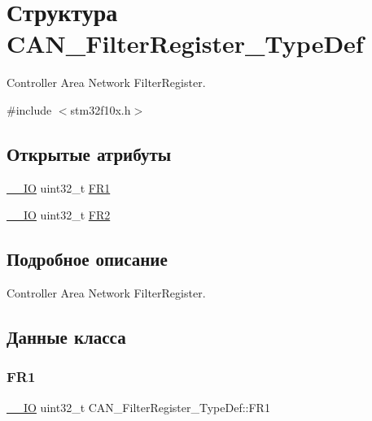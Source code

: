 \hypertarget{struct_c_a_n___filter_register___type_def}{}\section{Структура C\+A\+N\+\_\+\+Filter\+Register\+\_\+\+Type\+Def}
\label{struct_c_a_n___filter_register___type_def}


Controller Area Network Filter\+Register.  




{\ttfamily \#include $<$stm32f10x.\+h$>$}

\subsection*{Открытые атрибуты}
\begin{DoxyCompactItemize}
\item 
\mbox{\hyperlink{group___c_m_s_i_s___c_m3__core__definitions_gaec43007d9998a0a0e01faede4133d6be}{\+\_\+\+\_\+\+IO}} uint32\+\_\+t \mbox{\hyperlink{struct_c_a_n___filter_register___type_def_ac9bc1e42212239d6830582bf0c696fc5}{F\+R1}}
\item 
\mbox{\hyperlink{group___c_m_s_i_s___c_m3__core__definitions_gaec43007d9998a0a0e01faede4133d6be}{\+\_\+\+\_\+\+IO}} uint32\+\_\+t \mbox{\hyperlink{struct_c_a_n___filter_register___type_def_a77959e28a302b05829f6a1463be7f800}{F\+R2}}
\end{DoxyCompactItemize}


\subsection{Подробное описание}
Controller Area Network Filter\+Register. 

\subsection{Данные класса}
\mbox{\label{struct_c_a_n___filter_register___type_def_ac9bc1e42212239d6830582bf0c696fc5}} 
\subsubsection{\texorpdfstring{FR1}{FR1}}
{\footnotesize\ttfamily \mbox{\hyperlink{group___c_m_s_i_s___c_m3__core__definitions_gaec43007d9998a0a0e01faede4133d6be}{\+\_\+\+\_\+\+IO}} uint32\+\_\+t C\+A\+N\+\_\+\+Filter\+Register\+\_\+\+Type\+Def\+::\+F\+R1}

